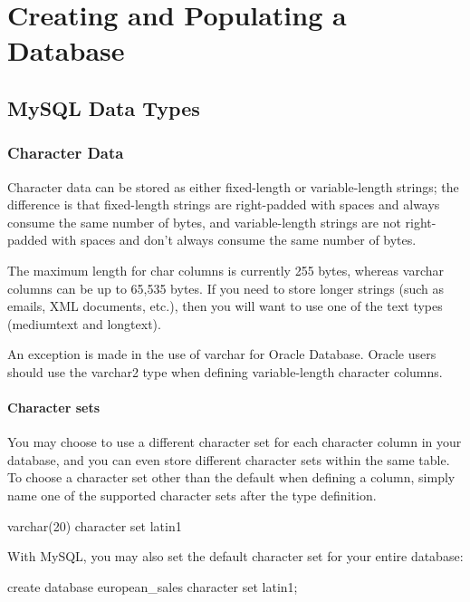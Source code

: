 \chapter{Creating and Populating a Database\label{Ch02}}
\section{MySQL Data Types}
\subsection{Character Data}
Character data can be stored as either fixed-length or variable-length strings; the difference is that fixed-length strings are right-padded with spaces and always consume the same number of bytes, and variable-length strings are not right-padded with spaces and don't always consume the same number of bytes.

The maximum length for char columns is currently 255 bytes, whereas varchar columns can be up to 65,535 bytes. If you need to store longer strings (such as emails,
XML documents, etc.), then you will want to use one of the text types (mediumtext
and longtext).

\begin{tcolorbox}
    An exception is made in the use of varchar for Oracle Database. Oracle users should use the varchar2 type when defining variable-length character columns.
\end{tcolorbox}

\subsubsection*{Character sets}

You may choose to use a different character set for each character column in your database, and you can even store different character sets within the same table. To choose a character set other than the default when defining a column, simply name one of the supported character sets after the type definition.

\textsf{varchar(20) character set latin1}

With MySQL, you may also set the default character set for your entire database:

\textsf{create database european\_sales character set latin1;}

